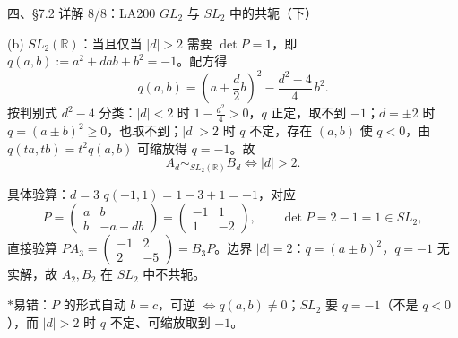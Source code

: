 \documentclass[aspectratio=169,10pt,fontset=none]{ctexbeamer}
\newcommand{\starpt}{\textcolor{accent}{\bfseries$\ast$}}
\begin{document}
\begin{frame}[t]{四、\S7.2 详解 8/8：LA200 $GL_2$ 与 $SL_2$ 中的共轭（下）}
\scriptsize
\begin{block}{\footnotesize (b) $SL_2(\mathbb R)$：当且仅当 $|d|>2$}
需要 $\det P=1$，即 $q(a,b):=a^2+dab+b^2=-1$。配方得
\[
q(a,b)=\left(a+\frac d2b\right)^2-\frac{d^2-4}{4}\,b^2.
\]
按判别式 $d^2-4$ 分类：$|d|<2$ 时 $1-\frac{d^2}{4}>0$，$q$ 正定，取不到 $-1$；$d=\pm2$ 时 $q=(a\pm b)^2\ge0$，也取不到；$|d|>2$ 时 $q$ 不定，存在 $(a,b)$ 使 $q<0$，由 $q(ta,tb)=t^2q(a,b)$ 可缩放得 $q=-1$。故
\[
A_d\sim_{SL_2(\mathbb R)}B_d\iff|d|>2.
\]
\end{block}
\begin{block}{\footnotesize 具体验算：$d=3$}
$q(-1,1)=1-3+1=-1$，对应
\[
P=\begin{pmatrix}a&b\\b&-a-db\end{pmatrix}=\begin{pmatrix}-1&1\\1&-2\end{pmatrix},\qquad \det P=2-1=1\in SL_2,
\]
直接验算 $PA_3=\begin{pmatrix}-1&2\\2&-5\end{pmatrix}=B_3P$。边界 $|d|=2$：$q=(a\pm b)^2$，$q=-1$ 无实解，故 $A_2,B_2$ 在 $SL_2$ 中不共轭。
\end{block}
\footnotesize\color{ink!80}
\starpt 易错：$P$ 的形式自动 $b=c$，可逆 $\iff q(a,b)\ne0$；$SL_2$ 要 $q=-1$（不是 $q<0$），而 $|d|>2$ 时 $q$ 不定、可缩放取到 $-1$。
\end{frame}

\end{document}
